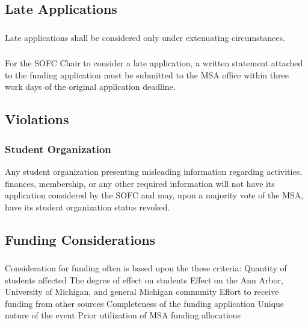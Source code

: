 \subsection{Late Applications}
\subsubsection{}
Late applications shall be considered only under extenuating circumstances.
\subsubsection{}
For the SOFC Chair to consider a late application, a written statement attached to the funding application must be submitted to the MSA office within three work days of the original application deadline.

\subsection{Violations}
\subsubsection{Student Organization}
\subsubsubsection{}
Any student organization presenting misleading information regarding activities, finances, membership, or any other required information will not have its application considered by the SOFC and may, upon a majority vote of the MSA, have its student organization status revoked. 

\subsection{Funding Considerations}
\subsubsection{}
Consideration for funding often is based upon the these criteria:
\subsubsubsection{}
Quantity of students affected
\subsubsubsection{}
The degree of effect on students
\subsubsubsection{}
Effect on the Ann Arbor, University of Michigan, and general Michigan community
\subsubsubsection{}
Effort to receive funding from other sources
\subsubsubsection{}
Completeness of the funding application
\subsubsubsection{}
Unique nature of the event
\subsubsubsection{}
Prior utilization of MSA funding allocations
